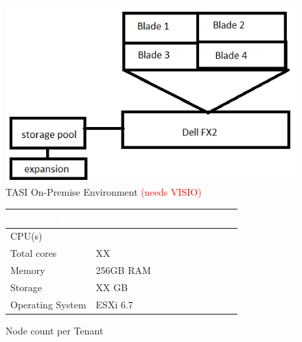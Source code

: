 \begin{figure}[H]
    \centering
    \includegraphics[scale = 0.70]{images/currentENV.png}
    \caption{TASI On-Premise Environment \textcolor{red}{(needs VISIO)} }
    \label{Current ENV}
\end{figure}

\begin{figure}[H]
\begin{center}
    \renewcommand{\arraystretch}{1.5}
    \begin{tabular}{|>{\raggedright\arraybackslash}l 
                    |>{\raggedright\arraybackslash}m{3cm}
                    |}
    \hline
    \rowcolor[HTML]{196fb4}\centering\textcolor{white}{\large Resource Type} 
                            & \centering\textcolor{white}{\large Resource Count (per Blade)} 
                            \tabularnewline 
    \hline
    CPU(s)              & 12 \\\hline
    Total cores         & XX \\\hline
    Memory              & 256GB RAM \\\hline
    Storage             & XX GB \\\hline
    Operating System    & ESXi 6.7 \\\hline
    \end{tabular}
\end{center}
\caption{Node count per Tenant}
\label{BLD-RSRC}
\end{figure}

